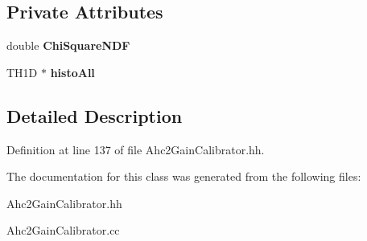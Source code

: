 \subsection*{Private Attributes}
\begin{DoxyCompactItemize}
\item 
double {\bfseries Chi\-Square\-N\-D\-F}\label{classCALICE_1_1Ahc2GainCalibrator_1_1CalibSpectrum_a2f60c8b4e5832f12939fd991483d62e2}

\item 
T\-H1\-D $\ast$ {\bfseries histo\-All}\label{classCALICE_1_1Ahc2GainCalibrator_1_1CalibSpectrum_a14d0addbe78fe019551c9c3f944006bc}

\end{DoxyCompactItemize}


\subsection{Detailed Description}


Definition at line 137 of file Ahc2\-Gain\-Calibrator.\-hh.



The documentation for this class was generated from the following files\-:\begin{DoxyCompactItemize}
\item 
Ahc2\-Gain\-Calibrator.\-hh\item 
Ahc2\-Gain\-Calibrator.\-cc\end{DoxyCompactItemize}
